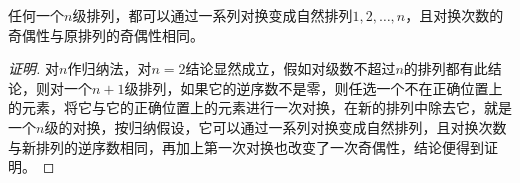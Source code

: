 \begin{theorem}
  任何一个$n$级排列，都可以通过一系列对换变成自然排列$1,2,\ldots,n$，且对换次数的奇偶性与原排列的奇偶性相同。
\end{theorem}

\begin{proof}[证明]
  对$n$作归纳法，对$n=2$结论显然成立，假如对级数不超过$n$的排列都有此结论，则对一个$n+1$级排列，如果它的逆序数不是零，则任选一个不在正确位置上的元素，将它与它的正确位置上的元素进行一次对换，在新的排列中除去它，就是一个$n$级的对换，按归纳假设，它可以通过一系列对换变成自然排列，且对换次数与新排列的逆序数相同，再加上第一次对换也改变了一次奇偶性，结论便得到证明。
\end{proof}


